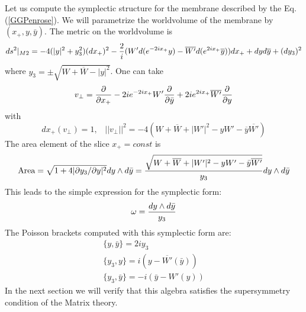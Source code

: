\documentclass[a4paper,12pt]{article}
\begin{document}
Let us compute the symplectic structure for the membrane
described by the Eq. (\ref{GGPenrose}).
We will parametrize the worldvolume of the membrane by
$(x_+,y,\bar{y})$. The metric on the worldvolume is
\begin{equation}
ds^2|_{M2}=-4 (|y|^2+y_3^2)(dx_+)^2 -
{2\over i}(W' d(e^{-2ix_+}y)-\overline{W'}d(e^{2ix_+}\overline{y})) dx_+ +
dy d\overline{y} +(d y_3)^2
\end{equation}
where $y_3=\pm\sqrt{W+\overline{W}-|y|^2}$. One can take
\begin{equation}\label{vPerp}
v_{\perp}={\partial\over\partial x_+}
-2i e^{-2ix_+}W' {\partial\over\partial\bar{y}}
+2i e^{2ix_+}\overline{W'}{\partial\over\partial y}
\end{equation}
with
\begin{equation}
dx_+(v_{\perp})=1,\;\;\;
||v_{\perp}||^2=-4(W+\overline{W}+|W'|^2-yW'-\overline{y}\overline{W'})
\end{equation}
The area element of the slice $x_+=const$ is
\begin{equation}
\mbox{Area}=\sqrt{1+4|\partial y_3/\partial y|^2}dy\wedge d\bar{y}=
{\sqrt{W+\overline{W}+|W'|^2- y W'
-\bar{y}\overline{W'}}\over y_3}dy\wedge d\bar{y}
\end{equation}
This leads to the simple expression for the symplectic form:
\begin{equation}
\omega={dy\wedge d\bar{y}\over y_3}
\end{equation}
The Poisson brackets computed with this symplectic form are:
\begin{equation}\label{PoissonBrackets}
\begin{array}{l}
\{y,\bar{y}\}=2iy_3\\[5pt]
\{y_3,y\}=i(y-\overline{W'}(\bar{y}))\\[5pt]
\{y_3,\bar{y}\}=-i(\bar{y}-W'(y))
\end{array}
\end{equation}
In the next section we will verify that this algebra satisfies the
supersymmetry condition of the Matrix theory.
\end{document}
